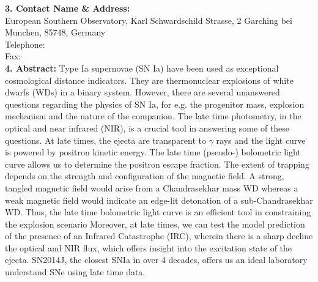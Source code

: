 \documentclass[11pt]{article}
\begin{document}
%
{\bf 3. Contact Name \& Address: }\\
European Southern Observatory,
Karl Schwardschild Strasse, 2
Garching bei Munchen, 85748, 
Germany
\\
Telephone:\\
Fax:\\
%
\textbf{ 4. Abstract: }
Type Ia supernovae (SN Ia) have been used as exceptional cosmological distance indicators. They are thermonuclear explosions of white dwarfs (WDs) in a binary system. However, there are several unanswered questions regarding the physics  of SN Ia, for e.g. the progenitor mass, explosion mechanism and the nature of the companion. The late time photometry, in the optical and near infrared (NIR), is a crucial tool in answering some of these questions. At late times, the ejecta are transparent to $\gamma$ rays and the light curve is powered by positron kinetic energy. The late time (pseudo-) bolometric light curve allows us to determine the positron escape fraction. The extent of trapping depends on the strength and configuration of the magnetic field. A strong, tangled magnetic field would arise from a Chandrasekhar mass WD whereas a weak magnetic field would indicate an edge-lit detonation of a sub-Chandrasekhar WD. Thus, the late time bolometric light curve is an efficient tool in constraining the explosion scenario
Moreover, at late times, we can test the model prediction of the presence of an Infrared Catastrophe (IRC), wherein there is a sharp decline the optical and NIR flux, which offers insight into the excitation state of the ejecta. SN2014J, the closest SNIa in over 4 decades, offers us an ideal laboratory understand SNe using late time data. %
\end{document}
